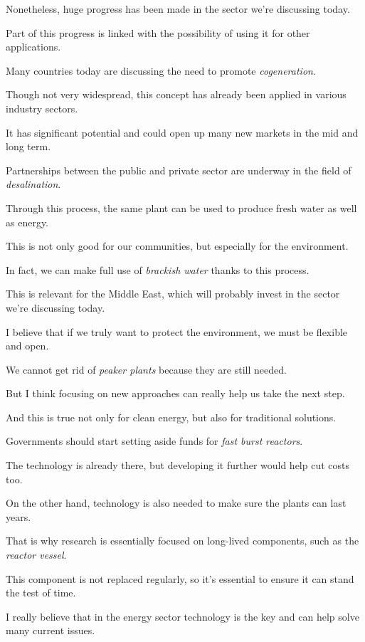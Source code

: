 Nonetheless, huge progress has been made in the sector we're discussing today.

\ex Part of this progress is linked with the possibility of using it for other applications.

Many countries today are discussing the need to promote \textit{cogeneration}.

Though not very widespread, this concept has already been applied in various industry sectors.

\ex It has significant potential and could open up many new markets in the mid and long term.

Partnerships between the public and private sector are underway in the field of \textit{desalination}.

Through this process, the same plant can be used to produce fresh water as well as energy.

\ex This is not only good for our communities, but especially for the environment.

In fact, we can make full use of \textit{brackish water} thanks to this process.

This is relevant for the Middle East, which will probably invest in the sector we're discussing today. 

\ex I believe that if we truly want to protect the environment, we must be flexible and open.

We cannot get rid of \textit{peaker plants} because they are still needed.

But I think focusing on new approaches can really help us take the next step.

\ex And this is true not only for clean energy, but also for traditional solutions.

Governments should start setting aside funds for \textit{fast burst reactors}.

The technology is already there, but developing it further would help cut costs too.

\ex On the other hand, technology is also needed to make sure the plants can last years.

That is why research is essentially focused on long-lived components, such as the \textit{reactor vessel}.

This component is not replaced regularly, so it's essential to ensure it can stand the test of time.

\ex I really believe that in the energy sector technology is the key and can help solve many current issues.

